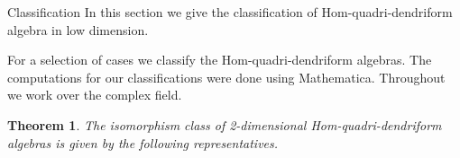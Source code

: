 \documentclass[11pt,twoside,reqno]{amsart}
\makeatletter
\renewcommand{\section}{\@startsection{section}{1}
  \z@{.7\linespacing\@plus\linespacing}{.5\linespacing}
  {\normalfont\upshape\bfseries\centering}}
\theoremstyle{plain}
\newtheorem{thm}{Theorem}[section]
\theoremstyle{definition}
\makeatother
\begin{document}
\section{Classification}
In this section  we give the classification of Hom-quadri-dendriform algebra in low dimension.

For a selection of cases  we classify the Hom-quadri-dendriform algebras. The computations for our classifications were done using Mathematica. Throughout  we work over the complex field.
\begin{thm}
The isomorphism class of 2-dimensional Hom-quadri-dendriform algebras is given by the following representatives.
\end{thm}
\end{document}

